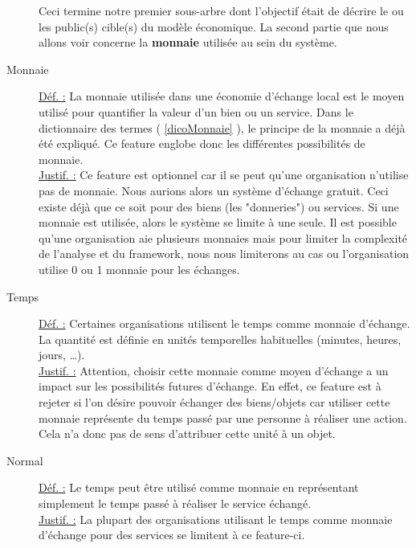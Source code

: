 \begin{description}
Ceci termine notre premier sous-arbre dont l'objectif était de décrire le ou les public(s) cible(s) du modèle économique.  La second partie que nous allons voir concerne la \textbf{monnaie} utilisée au sein du système.

\begin{center}
\end{center}

\item [Monnaie]
\underline{Déf. :}  La monnaie utilisée dans une économie d'échange local est le moyen utilisé pour quantifier la valeur d'un bien ou un service.  Dans le dictionnaire des termes ( \ref{dicoMonnaie} ),  le principe de la monnaie a déjà été expliqué.   Ce feature englobe donc les différentes possibilités de monnaie.
\\ \underline{Justif. :}  Ce feature est optionnel car il se peut qu'une organisation n'utilise pas de monnaie.  Nous aurions alors un système d'échange gratuit.  Ceci existe déjà que ce soit pour des biens (les "donneries") ou services.  Si une monnaie est utilisée,  alors le système se limite à une seule.  Il est possible qu'une organisation aie plusieurs monnaies mais pour limiter la complexité de l'analyse et du framework,  nous nous limiterons au cas ou l'organisation utilise 0 ou 1 monnaie pour les échanges.
\newline

\item [Temps]
\underline{Déf. :}  Certaines organisations utilisent le temps comme monnaie d'échange.  La quantité est définie en unités temporelles habituelles (minutes,  heures,  jours, \dots ).  
\\ \underline{Justif. :}  Attention,  choisir cette monnaie comme moyen d'échange a un impact sur les possibilités futures d'échange.  En effet,  ce feature est à rejeter si l'on désire pouvoir échanger des biens/objets car utiliser cette monnaie représente du temps passé par une personne à réaliser une action.  Cela n'a donc pas de sens d'attribuer cette unité à un objet.
\newline

\item [Normal]
\underline{Déf. :}  Le temps peut être utilisé comme monnaie en représentant simplement le temps passé à réaliser le service échangé.
\\ \underline{Justif. :}  La plupart des organisations utilisant le temps comme monnaie d'échange pour des services se limitent à ce feature-ci.
\newline


\end{description}
